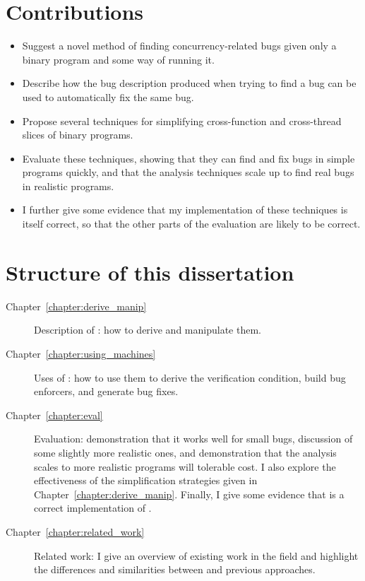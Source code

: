 \section{Contributions}

\begin{itemize}
\item
  Suggest a novel method of finding concurrency-related bugs given
  only a binary program and some way of running it.
\item
  Describe how the bug description produced when trying to find a bug
  can be used to automatically fix the same bug.
\item
  Propose several techniques for simplifying cross-function and
  cross-thread slices of binary programs.
\item
  Evaluate these techniques, showing that they can find and fix bugs
  in simple programs quickly, and that the analysis techniques
   scale up to find real bugs in realistic
  programs.
\item
  I further give some evidence that my implementation of these
  techniques is itself correct, so that the other parts of the
  evaluation are likely to be correct.
\end{itemize}


\section{Structure of this dissertation}

\begin{description}
\item[Chapter~\ref{chapter:derive_manip}] Description of
  \StateMachines: how to derive and manipulate them.
\item[Chapter~\ref{chapter:using_machines}] Uses of \StateMachines:
  how to use them to derive the verification condition, build bug
  enforcers, and generate bug fixes.
\item[Chapter~\ref{chapter:eval}] Evaluation: demonstration that it
  works well for small bugs, discussion of some slightly more
  realistic ones, and demonstration that the analysis scales to more
  realistic programs will tolerable cost.  I also explore the
  effectiveness of the {\StateMachine} simplification strategies given
  in Chapter~\ref{chapter:derive_manip}.  Finally, I give some
  evidence that {\implementation} is a correct implementation of
  {\technique}.
\item[Chapter~\ref{chapter:related_work}] Related work: I give an
  overview of existing work in the field and highlight the differences
  and similarities between {\technique} and previous approaches.
\end{description}

